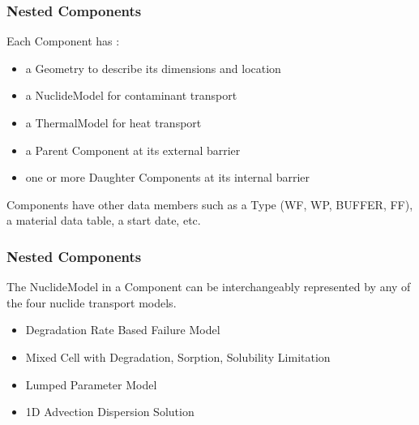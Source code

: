\begin{frame}
  \frametitle{Nested Components}
  Each Component has : 
  \begin{itemize}
    \item a Geometry to describe its dimensions and location
    \item a NuclideModel for contaminant transport 
    \item a ThermalModel for heat transport
    \item a Parent Component at its external barrier
    \item one or more Daughter Components at its internal barrier
  \end{itemize}

  Components have other data members such as a Type (WF, WP, BUFFER, FF), a 
  material data table, a start date, etc. 
\end{frame}

\begin{frame}
  \frametitle{Nested Components}
  The NuclideModel in a Component can be interchangeably represented by any of 
  the four nuclide transport models. 
    \begin{itemize}
      \item Degradation Rate Based Failure Model
      \item Mixed Cell with Degradation, Sorption, Solubility Limitation
      \item Lumped Parameter Model
      \item 1D Advection Dispersion Solution
    \end{itemize}
\end{frame}

